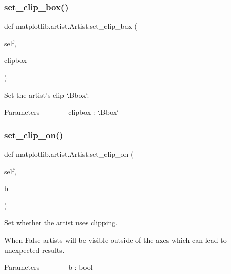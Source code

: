 \subsubsection{\texorpdfstring{set\+\_\+clip\+\_\+box()}{set\_clip\_box()}}
{\footnotesize\ttfamily def matplotlib.\+artist.\+Artist.\+set\+\_\+clip\+\_\+box (\begin{DoxyParamCaption}\item[{}]{self,  }\item[{}]{clipbox }\end{DoxyParamCaption})}

\begin{DoxyVerb}Set the artist's clip `.Bbox`.

Parameters
----------
clipbox : `.Bbox`
\end{DoxyVerb}
 \mbox{\label{classmatplotlib_1_1artist_1_1Artist_a6179b34cff92122ad9a30a864394638f}} 
\subsubsection{\texorpdfstring{set\+\_\+clip\+\_\+on()}{set\_clip\_on()}}
{\footnotesize\ttfamily def matplotlib.\+artist.\+Artist.\+set\+\_\+clip\+\_\+on (\begin{DoxyParamCaption}\item[{}]{self,  }\item[{}]{b }\end{DoxyParamCaption})}

\begin{DoxyVerb}Set whether the artist uses clipping.

When False artists will be visible outside of the axes which
can lead to unexpected results.

Parameters
----------
b : bool
\end{DoxyVerb}
 \mbox{\label{classmatplotlib_1_1artist_1_1Artist_aa421287f2bcb337e0e14badacd4b5bcd}} 
